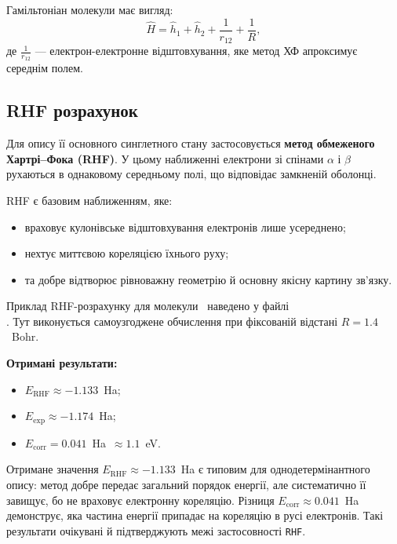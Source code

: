Гамільтоніан молекули має вигляд:
\[
	\hat{H} = \hat{h}_1 + \hat{h}_2 + \frac{1}{r_{12}} + \frac{1}{R},
\]
де $\frac{1}{r_{12}}$ --- електрон-електронне відштовхування,
яке метод ХФ апроксимує середнім полем.


\subsection{RHF розрахунок}


Для опису її основного синглетного стану застосовується
\textbf{метод обмеженого Хартрі–Фока (RHF)}.
У цьому наближенні електрони зі спінами $\alpha$ і $\beta$
рухаються в однаковому середньому полі, що відповідає замкненій оболонці.

RHF є базовим наближенням, яке:
\begin{itemize}
	\item враховує кулонівське відштовхування електронів лише усереднено;
	\item нехтує миттєвою кореляцією їхнього руху;
	\item та добре відтворює рівноважну геометрію й основну якісну картину зв’язку.
\end{itemize}

Приклад RHF-розрахунку для молекули~
наведено у файлі \\ .
Тут виконується самоузгоджене обчислення при фіксованій відстані $R = 1.4$~Bohr.

\textbf{Отримані результати:}
\begin{itemize}
	\item $E_{\text{RHF}} \approx -1.133$~Ha;
	\item $E_{\text{exp}} \approx -1.174$~Ha;
	\item $E_{\text{corr}} = 0.041$~Ha~$\approx 1.1$~eV.
\end{itemize}


Отримане значення $E_{\mathrm{RHF}}\approx -1.133$~Ha є типовим для однодетермінантного опису: метод добре передає загальний порядок енергії, але систематично її завищує, бо не враховує електронну кореляцію. Різниця $E_{\mathrm{corr}}\approx 0.041$~Ha демонструє, яка частина енергії припадає на кореляцію в русі електронів. Такі результати очікувані й підтверджують межі застосовності \texttt{RHF}.


